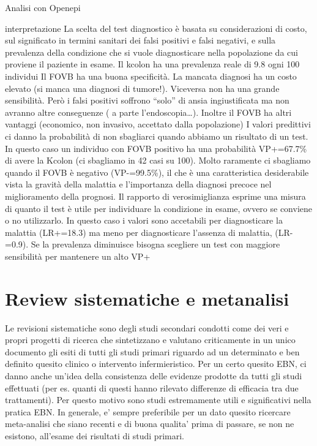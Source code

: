\documentclass[]{book}
\begin{document}
Analisi con Openepi

interpretazione
La scelta del test diagnostico è basata su considerazioni di costo, sul significato in termini sanitari dei falsi positivi e falsi negativi, e sulla prevalenza della condizione che si vuole diagnosticare nella popolazione da cui proviene il paziente in esame.
Il kcolon ha una prevalenza reale di 9.8 ogni 100 individui
Il FOVB ha una buona specificità. La mancata diagnosi ha un costo elevato (si manca una diagnosi di tumore!). Viceversa non ha una grande sensibilità. Però i falsi positivi soffrono ``solo'' di ansia ingiustificata ma non avranno altre conseguenze ( a parte l'endoscopia\ldots{}). Inoltre il FOVB ha altri vantaggi (economico, non invasivo, accettato dalla popolazione)
I valori predittivi ci danno la probabilità di non sbagliarci quando abbiamo un risultato di un test.
In questo caso un individuo con FOVB positivo ha una probabilità VP+=67.7\% di avere la Kcolon (ci sbagliamo in 42 casi su 100). Molto raramente ci sbagliamo quando il FOVB è negativo (VP-=99.5\%), il che è una caratteristica desiderabile vista la gravità della malattia e l'importanza della diagnosi precoce nel miglioramento della prognosi.
Il rapporto di verosimiglianza esprime una misura di quanto il test è utile per individuare la condizione in esame, ovvero se conviene o no utilizzarlo. In questo caso i valori sono accetabili per diagnosticare la malattia (LR+=18.3) ma meno per diagnosticare l'assenza di malattia, (LR- =0.9).
Se la prevalenza diminuisce bisogna scegliere un test con maggiore sensibilità per mantenere un alto VP+

\hypertarget{review-sistematiche-e-metanalisi}{%
\chapter{Review sistematiche e metanalisi}\label{review-sistematiche-e-metanalisi}}

Le revisioni sistematiche sono degli studi secondari condotti come dei veri e propri progetti di ricerca che sintetizzano e valutano criticamente in un unico documento gli esiti di tutti gli studi primari riguardo ad un determinato e ben definito quesito clinico o intervento infermieristico. Per un certo quesito EBN, ci danno anche un'idea della consistenza delle evidenze prodotte da tutti gli studi effettuati (per es. quanti di questi hanno rilevato differenze di efficacia tra due trattamenti). Per questo motivo sono studi estremamente utili e significativi nella pratica EBN. In generale, e' sempre preferibile per un dato quesito ricercare meta-analisi che siano recenti e di buona qualita' prima di passare, se non ne esistono, all'esame dei risultati di studi primari.
\end{document}
